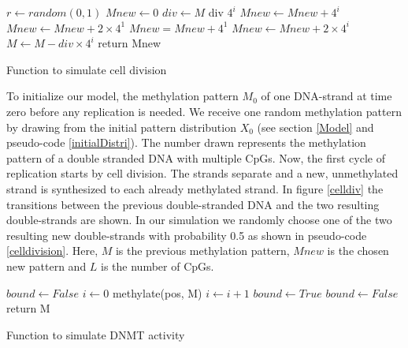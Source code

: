 \begin{algorithm}
\begin{algorithmic}
\State $r \gets random(0,1)$
\State $Mnew \gets 0$
	\State $div \gets M$ div $4^i$
		\State $Mnew \gets Mnew + 4^i$
	\Else
			\State $Mnew \gets Mnew + 2 \times 4^1$
		\Else
				\State $Mnew = Mnew + 4^1$
			\Else
					\State $Mnew \gets Mnew + 2 \times 4^i$
				\EndIf
			\EndIf
		\EndIf
	\EndIf
	\State $M \gets M - div \times 4^i$
\EndFor
\State return Mnew
\EndProcedure
\end{algorithmic}
\caption{\label{celldivision} Function to simulate cell division}
\end{algorithm}
To initialize our model, the methylation pattern $M_0$ of one DNA-strand at time zero before any replication is needed. We receive one random methylation pattern by drawing from the initial pattern distribution $X_0$ (see section \ref{Model} and pseudo-code \ref{initialDistri}). The number drawn represents the methylation pattern of a double stranded DNA with multiple \acp{CpG}. Now, the first cycle of replication starts by cell division. The strands separate and a new, unmethylated strand is synthesized to each already methylated strand. In figure \ref{celldiv} the transitions between the previous double-stranded DNA and the two resulting double-strands are shown. In our simulation we randomly choose one of the two resulting new double-strands with probability 0.5 as shown in pseudo-code \ref{celldivision}. Here, $M$ is the previous methylation pattern, $Mnew$ is the chosen new pattern and $L$ is the number of \acp{CpG}.\newline

\begin{algorithm}
\begin{algorithmic}
\State $bound \gets False$
\State $i \gets 0$
				\State methylate(pos, M) 
			\EndIf 
			\State $i \gets i + 1$
		\EndIf
			\State $bound \gets True$
		\Else
			\State $bound \gets False$
		\EndIf
	\EndIf
\EndFor
\State return M
\EndProcedure
\end{algorithmic}
\caption{\label{simulateDNMT} Function to simulate DNMT activity}
\end{algorithm}

